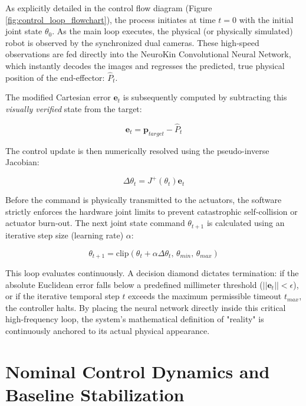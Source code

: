 \documentclass[12pt,a4paper,oneside]{report}
\begin{document}
As explicitly detailed in the control flow diagram (Figure \ref{fig:control_loop_flowchart}), the process initiates at time $t=0$ with the initial joint state $\theta_0$. As the main loop executes, the physical (or physically simulated) robot is observed by the synchronized dual cameras. These high-speed observations are fed directly into the NeuroKin Convolutional Neural Network, which instantly decodes the images and regresses the predicted, true physical position of the end-effector: $\hat{P}_t$.

The modified Cartesian error $\mathbf{e}_t$ is subsequently computed by subtracting this \textit{visually verified} state from the target:

\begin{equation}
\mathbf{e}_t = \mathbf{p}_{target} - \hat{P}_t
\end{equation}

The control update is then numerically resolved using the pseudo-inverse Jacobian:

\begin{equation}
\Delta \theta_t = J^+(\theta_t) \mathbf{e}_t
\end{equation}

Before the command is physically transmitted to the actuators, the software strictly enforces the hardware joint limits to prevent catastrophic self-collision or actuator burn-out. The next joint state command $\theta_{t+1}$ is calculated using an iterative step size (learning rate) $\alpha$:

\begin{equation}
\theta_{t+1} = \text{clip}(\theta_t + \alpha \Delta \theta_t, \, \theta_{min}, \, \theta_{max})
\end{equation}

This loop evaluates continuously. A decision diamond dictates termination: if the absolute Euclidean error falls below a predefined millimeter threshold ($||\mathbf{e}_t|| < \epsilon$), or if the iterative temporal step $t$ exceeds the maximum permissible timeout $t_{max}$, the controller halts. By placing the neural network directly inside this critical high-frequency loop, the system’s mathematical definition of "reality" is continuously anchored to its actual physical appearance.

\section{Nominal Control Dynamics and Baseline Stabilization}
\end{document}
